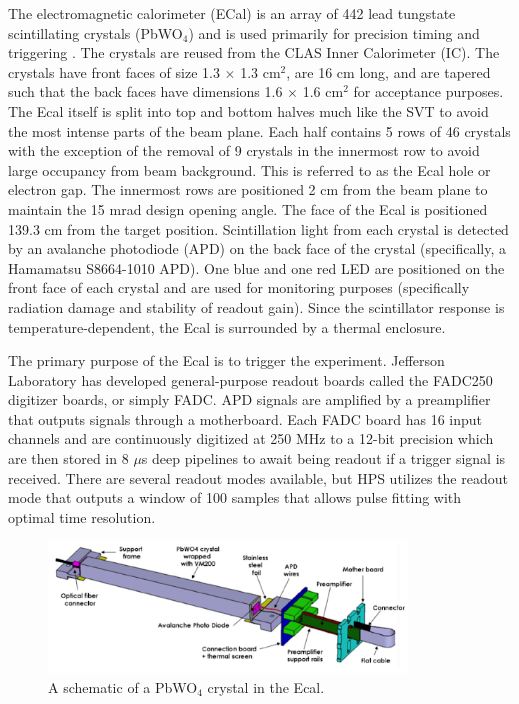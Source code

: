 The electromagnetic calorimeter (ECal) is an array of 442 lead tungstate scintillating crystals (PbWO$_4$) and is used primarily for precision timing and triggering \cite{Balossino_2017}. The crystals are reused from the CLAS Inner Calorimeter (IC). The crystals have front faces of size 1.3 $\times$ 1.3 cm$^2$, are 16 cm long, and are tapered such that the back faces have dimensions 1.6 $\times$ 1.6 cm$^2$ for acceptance purposes. The Ecal itself is split into top and bottom halves much like the SVT to avoid the most intense parts of the beam plane. Each half contains 5 rows of 46 crystals with the exception of the removal of 9 crystals in the innermost row to avoid large occupancy from beam background. This is referred to as the Ecal hole or electron gap. The innermost rows are positioned 2 cm from the beam plane to maintain the 15 mrad design opening angle. The face of the Ecal is positioned 139.3 cm from the target position. Scintillation light from each crystal is detected by an avalanche photodiode (APD) on the back face of the crystal (specifically, a Hamamatsu S8664-1010 APD). One blue and one red LED are positioned on the front face of each crystal and are used for monitoring purposes (specifically radiation damage and stability of readout gain). Since the scintillator response is temperature-dependent, the Ecal is surrounded by a thermal enclosure.

The primary purpose of the Ecal is to trigger the experiment. Jefferson Laboratory has developed general-purpose readout boards called the FADC250 digitizer boards, or simply FADC. APD signals are amplified by a preamplifier that outputs signals through a motherboard. Each FADC board has 16 input channels and are continuously digitized at 250 MHz to a 12-bit precision which are then stored in 8 $\mu$s deep pipelines to await being readout if a trigger signal is received. There are several readout modes available, but HPS utilizes the readout mode that outputs a window of 100 samples that allows pulse fitting with optimal time resolution.

\begin{figure}
    \centering
    \includegraphics[width=0.85\textwidth]{figs/detector/ecal_crystal.png}
    \caption{A schematic of a PbWO$_4$ crystal in the Ecal.}
    \label{fig:ecalcrystal}
\end{figure}

